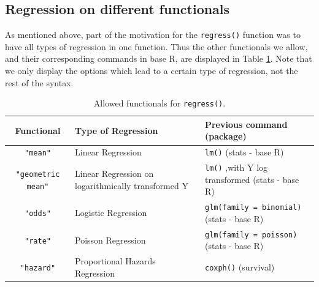 \documentclass[landscape]{article}
\begin{document}
\subsection{Regression on different functionals}
As mentioned above, part of the motivation for the \texttt{regress()} function was to have all types of regression in one function. Thus the other functionals we allow, and their corresponding commands in base R, are displayed in Table \ref{fnctl}. Note that we only display the options which lead to a certain type of regression, not the rest of the syntax.

\begin{table}[ht]
\centering
\begin{tabular}{c|l|l}
Functional & Type of Regression & Previous command (package)\\
\hline
\texttt{"mean"} & Linear Regression & \texttt{lm()} (stats - base R)\\
\texttt{"geometric mean"} & Linear Regression on logarithmically transformed Y & \texttt{lm()} ,with Y log transformed (stats - base R)\\
\texttt{"odds"} & Logistic Regression & \texttt{glm(family = binomial)} (stats - base R)\\
\texttt{"rate"} & Poisson Regression & \texttt{glm(family = poisson)} (stats - base R)\\
\texttt{"hazard"} & Proportional Hazards Regression & \texttt{coxph()} (survival)
\end{tabular}
\caption{Allowed functionals for \texttt{regress()}.}
\label{fnctl}
\end{table}
\FloatBarrier
\end{document}
